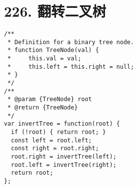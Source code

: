 \newpage
\section{226. 翻转二叉树}
\label{leetcode:226}

\begin{verbatim}
/**
 * Definition for a binary tree node.
 * function TreeNode(val) {
 *     this.val = val;
 *     this.left = this.right = null;
 * }
 */
/**
 * @param {TreeNode} root
 * @return {TreeNode}
 */
var invertTree = function(root) {
  if (!root) { return root; }
  const left = root.left;
  const right = root.right;
  root.right = invertTree(left);
  root.left = invertTree(right);
  return root;
};
\end{verbatim}